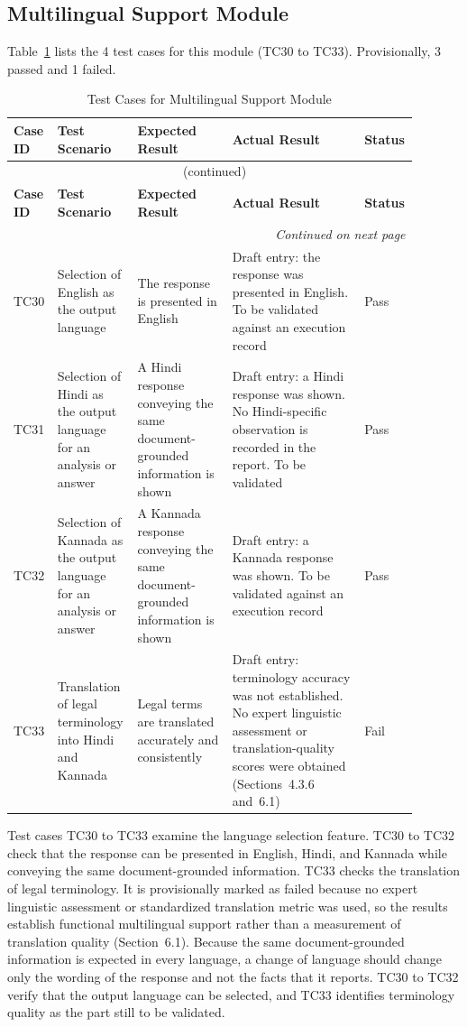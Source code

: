 \documentclass[12pt,a4paper,oneside]{report}
\begin{document}
\subsection{Multilingual Support Module}
Table~\ref{tab:multi} lists the 4 test cases for this module (TC30 to TC33). Provisionally, 3 passed and 1 failed.
{\footnotesize
\setlength{\tabcolsep}{3pt}
\renewcommand{\arraystretch}{1.15}
\begin{longtable}{|p{0.075\linewidth}|p{0.19\linewidth}|p{0.23\linewidth}|p{0.32\linewidth}|p{0.08\linewidth}|}
\caption{Test Cases for Multilingual Support Module}\label{tab:multi}\\
\hline
\textbf{Case ID} & \textbf{Test Scenario} & \textbf{Expected Result} & \textbf{Actual Result} & \textbf{Status}\\
\hline
\endfirsthead
\multicolumn{5}{c}{\tablename~\thetable{} (continued)}\\
\hline
\textbf{Case ID} & \textbf{Test Scenario} & \textbf{Expected Result} & \textbf{Actual Result} & \textbf{Status}\\
\hline
\endhead
\hline
\multicolumn{5}{r}{\emph{Continued on next page}}\\
\endfoot
\hline
\endlastfoot
TC30 & Selection of English as the output language & The response is presented in English & Draft entry: the response was presented in English. To be validated against an execution record & Pass\\
\hline
TC31 & Selection of Hindi as the output language for an analysis or answer & A Hindi response conveying the same document-grounded information is shown & Draft entry: a Hindi response was shown. No Hindi-specific observation is recorded in the report. To be validated & Pass\\
\hline
TC32 & Selection of Kannada as the output language for an analysis or answer & A Kannada response conveying the same document-grounded information is shown & Draft entry: a Kannada response was shown. To be validated against an execution record & Pass\\
\hline
TC33 & Translation of legal terminology into Hindi and Kannada & Legal terms are translated accurately and consistently & Draft entry: terminology accuracy was not established. No expert linguistic assessment or translation-quality scores were obtained (Sections~4.3.6 and~6.1) & Fail\\
\end{longtable}
}

Test cases TC30 to TC33 examine the language selection feature. TC30 to TC32 check that the response can be presented in English, Hindi, and Kannada while conveying the same document-grounded information. TC33 checks the translation of legal terminology. It is provisionally marked as failed because no expert linguistic assessment or standardized translation metric was used, so the results establish functional multilingual support rather than a measurement of translation quality (Section~6.1). Because the same document-grounded information is expected in every language, a change of language should change only the wording of the response and not the facts that it reports. TC30 to TC32 verify that the output language can be selected, and TC33 identifies terminology quality as the part still to be validated.
\end{document}
